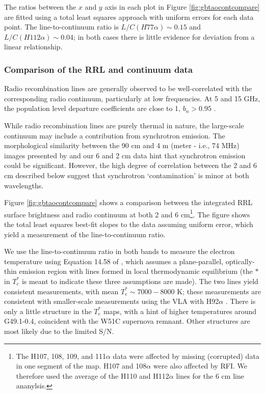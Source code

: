 The ratios between the $x$ and $y$ axis in each plot in Figure
\ref{fig:gbtaocontcompare} are fitted using a total least squares approach with
uniform errors for each data point.   The line-to-continuum ratio is
$L/C(H77\alpha)\sim0.15$ and $L/C(H112\alpha)\sim0.04$; in both cases there is
little evidence for deviation from a linear relationship.

\subsubsection{Comparison of the RRL and continuum data}
\label{sec:rrlvscont}
Radio recombination lines are generally observed to be well-correlated with the
corresponding radio continuum, particularly at low frequencies.  At 5 and 15
GHz, the population level departure coefficients are close to 1, $b_n > 0.95$
\citep{Wilson2009a,Walmsley1990a}.

While radio recombination lines are purely thermal in nature, the large-scale
continuum may include a contribution from synchrotron emission.  The
morphological similarity between the 90 cm and 4 m (meter - i.e., 74 MHz)
images presented by \citet{Brogan2013a} and our 6 and 2 cm data hint that
synchrotron emission could be significant.  However, the high degree of
correlation between the 2 and 6 cm described below suggest that synchrotron
`contamination' is minor at both wavelengths.

Figure \ref{fig:gbtaocontcompare} shows a comparison between the integrated RRL
surface brightness and radio continuum at both 2 and 6 cm\footnote{The H107,
108, 109, and 111$\alpha$ data were affected by missing (corrupted) data in one
segment of the map.  H107 and 108$\alpha$ were also affected by RFI.  We
therefore used the average of the H110 and H112$\alpha$ lines for the 6 cm line
ananylsis.}.  The figure shows
the total least squares best-fit slopes to the data assuming uniform error,
which yield a measurement of the line-to-continuum ratio.

We use the line-to-continuum ratio in both bands to measure the electron
temperature using Equation 14.58 of \citet{Wilson2009a}, which assumes a
plane-parallel, optically-thin emission region with lines formed in local
thermodynamic equilibrium (the $*$ in $T_e^*$ is meant to indicate these three
assumptions are made).  The two lines yield consistent measurements, with mean
$T_e^*\sim7000-8000$ K; these measurements are consistent with smaller-scale
measurements using the VLA with H92$\alpha$ \citep{Mehringer1994a}.  There is
only a little structure in the $T_e^*$ maps, with a hint of higher temperatures
around G49.1-0.4, coincident with the W51C supernova remnant.  Other structures
are most likely due to the limited S/N.

